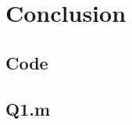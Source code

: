 \documentclass[12pt]{article}
\begin{document}
    


    


    \markboth{}{}


    

    

    

    \section*{Conclusion}

    \pagebreak

    

    \begin{appendices}
        \section{Code}
            \subsection{Q1.m}
            \label{sec:q1}
    \end{appendices}
\end{document}
